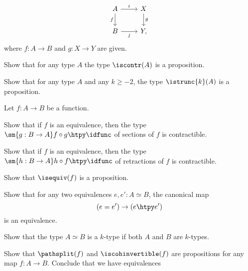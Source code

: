 \begin{exercises}
\begin{subexenum}
\begin{equation*}
      \begin{tikzcd}
        A \arrow[d,swap,"f"] \arrow[r,"i"] & X \arrow[d,"g"] \\
        B \arrow[r,swap,"j"] & Y,
      \end{tikzcd}
    \end{equation*}
    where $f:A\to B$ and $g:X\to Y$ are given.
  \end{subexenum}
  \exitem \label{ex:isprop_istrunc}
  \begin{subexenum}
  \item Show that for any type $A$ the type $\iscontr(A)$ is a proposition.
  \item Show that for any type $A$ and any $k\geq-2$, the type $\istrunc{k}(A)$ is a proposition.
  \end{subexenum}
  \exitem \label{ex:isprop_isequiv}Let $f:A\to B$ be a function.
  \begin{subexenum}
  \item Show that if $f$ is an equivalence, then the type $\sm{g:B\to A}f\circ g\htpy \idfunc$ of sections of $f$ is contractible.
  \item Show that if $f$ is an equivalence, then the type $\sm{h:B\to A}h\circ f\htpy \idfunc$ of retractions of $f$ is contractible.
  \item Show that $\isequiv(f)$ is a proposition.
  \item Show that for any two equivalences $e,e':A\simeq B$, the canonical map
    \begin{equation*}
      (e=e')\to (e\htpy e')
    \end{equation*}
    is an equivalence.
  \item Show that the type $A\simeq B$ is a $k$-type if both $A$ and $B$ are $k$-types.
  \end{subexenum}
  \exitem
  \begin{subexenum}
  \item Show that $\pathsplit(f)$ and $\iscohinvertible(f)$ are propositions for any map $f:A\to B$. Conclude that we have equivalences

\end{subexenum}
\end{exercises}
